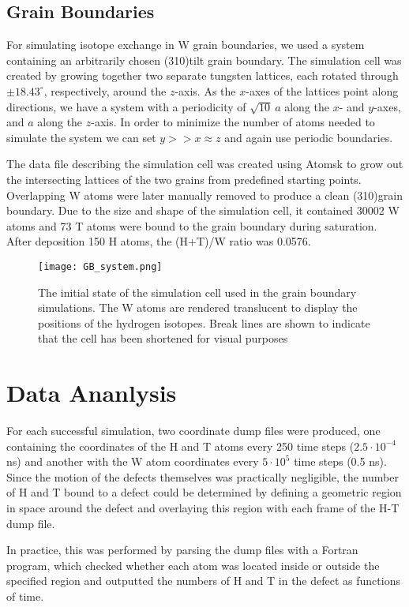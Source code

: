 \subsection{Grain Boundaries}
For simulating isotope exchange in W grain boundaries, we used a system containing an arbitrarily chosen \hkl(310)\hkl[001] tilt grain boundary. 
The simulation cell was created by growing together two separate tungsten lattices, each rotated through $\pm18.43^\circ$, respectively, around the $z$-axis. 
As the $x$-axes of the lattices point along  directions, we have a system with a periodicity of $\sqrt{10}~a$ along the $x$- and $y$-axes, and $a$ along the $z$-axis. 
In order to minimize the number of atoms needed to simulate the system we can set $y >> x \approx z$ and again use periodic boundaries.


The data file describing the simulation cell was created using Atomsk \cite{hirel2015atomsk} to grow out the intersecting lattices of the two grains from predefined starting points. 
Overlapping W atoms were later manually removed to produce a clean \hkl(310)\hkl[001] grain boundary.
Due to the size and shape of the simulation cell, it contained 30002 W atoms and 73 T atoms were bound to the grain boundary during saturation.
After deposition 150 H atoms, the (H+T)/W ratio was 0.0576.

\begin{figure}[!ht]
\center
\texttt{[image: GB\_system.png]}
\caption{The initial state of the simulation cell used in the grain boundary simulations. 
The W atoms are rendered translucent to display the positions of the hydrogen isotopes. Break lines are shown to indicate that the cell has been shortened for visual purposes}
\label{Fig:GB_system}
\end{figure}

\section{Data Ananlysis}

For each successful simulation, two coordinate dump files were produced, one containing the coordinates of the H and T atoms every 250 time steps ($2.5\cdot 10^{-4}$ ns) and another with the W atom coordinates every $5\cdot 10^5$ time steps (0.5 ns).
Since the motion of the defects themselves was practically negligible, the number of H and T bound to a defect could be determined by defining a geometric region in space around the defect and overlaying this region with each frame of the H-T dump file.

In practice, this was performed by parsing the dump files with a Fortran program, which checked whether each atom was located inside or outside the specified region and outputted the numbers of H and T in the defect as functions of time.

